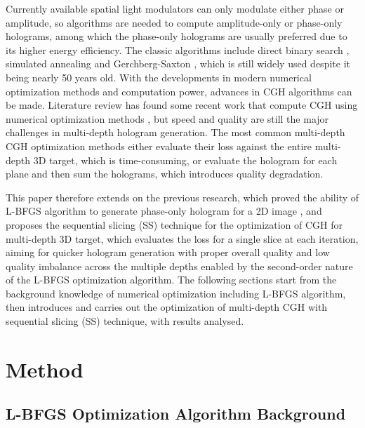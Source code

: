 Currently available spatial light modulators can only modulate either phase or amplitude, so algorithms are needed to compute amplitude-only or phase-only holograms, among which the phase-only holograms are usually preferred due to its higher energy efficiency. The classic algorithms include direct binary search \cite{Seldowitz1987}, simulated annealing \cite{Kirkpatrick1983} and Gerchberg-Saxton \cite{Gerchberg1972}, which is still widely used despite it being nearly 50 years old. With the developments in modern numerical optimization methods and computation power, advances in CGH algorithms can be made. Literature review has found some recent work that compute CGH using numerical optimization methods \cite{Zhang2017, Liu2020, Choi2021, Chen2021, Kadis2022}, but speed and quality are still the major challenges in multi-depth hologram generation. The most common multi-depth CGH optimization methods either evaluate their loss against the entire multi-depth 3D target, which is time-consuming, or evaluate the hologram for each plane and then sum the holograms, which introduces quality degradation.

This paper therefore extends on the previous research, which proved the ability of L-BFGS algorithm to generate phase-only hologram for a 2D image \cite{Sha2022}, and proposes the sequential slicing (SS) technique for the optimization of CGH for multi-depth 3D target, which evaluates the loss for a single slice at each iteration, aiming for quicker hologram generation with proper overall quality and low quality imbalance across the multiple depths enabled by the second-order nature of the L-BFGS optimization algorithm. The following sections start from the background knowledge of numerical optimization including L-BFGS algorithm, then introduces and carries out the optimization of multi-depth CGH with sequential slicing (SS) technique, with results analysed.



\section{Method} \label{sec:Method}

\subsection{L-BFGS Optimization Algorithm Background}

